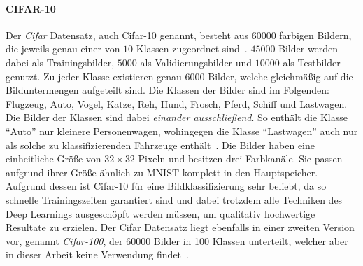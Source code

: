 \paragraph{CIFAR-10}
\label{cifar_10}

Der \emph{\gls{Cifar}} Datensatz, auch \gls{Cifar}-10 genannt, besteht aus $60000$ farbigen Bildern, die jeweils genau einer von $10$ Klassen zugeordnet sind~\cite{cifar_10}.
$45000$ Bilder werden dabei als Trainingsbilder, $5000$ als Validierungsbilder und $10000$ als Testbilder genutzt.
Zu jeder Klasse existieren genau $6000$ Bilder, welche gleichmäßig auf die Bilduntermengen aufgeteilt sind.
Die Klassen der Bilder sind im Folgenden: Flugzeug, Auto, Vogel, Katze, Reh, Hund, Frosch, Pferd, Schiff und Lastwagen.
Die Bilder der Klassen sind dabei \emph{einander ausschließend}.
So enthält die Klasse \enquote{Auto} nur kleinere Personenwagen, wohingegen die Klasse \enquote{Lastwagen} auch nur als solche zu klassifizierenden Fahrzeuge enthält~\cite{cifar_10}.
Die Bilder haben eine einheitliche Größe von $32 \times 32$ Pixeln und besitzen drei Farbkanäle.
Sie passen aufgrund ihrer Größe ähnlich zu \gls{MNIST} komplett in den Hauptspeicher.
Aufgrund dessen ist \gls{Cifar}-10 für eine Bildklassifizierung sehr beliebt, da so schnelle Trainingszeiten garantiert sind und dabei trotzdem alle Techniken des Deep Learnings ausgeschöpft werden müssen, um qualitativ hochwertige Resultate zu erzielen.
Der \gls{Cifar} Datensatz liegt ebenfalls in einer zweiten Version vor, genannt \emph{\gls{Cifar}-100}, der 60000 Bilder in 100 Klassen unterteilt, welcher aber in dieser Arbeit keine Verwendung findet~\cite{cifar_10}.

